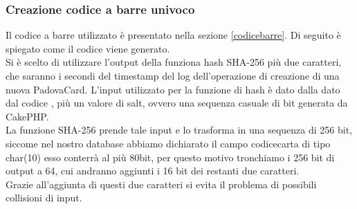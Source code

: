 \subsubsection{Creazione codice a barre univoco}
Il codice a barre utilizzato è presentato nella sezione \ref{codicebarre}. Di seguito è spiegato come il codice viene generato. \\

Si è scelto di utilizzare l'output della funziona hash SHA-256 più due caratteri, che saranno i secondi del timestamp del log dell'operazione di creazione di una nuova PadovaCard. 
L'input utilizzato per la funzione di hash è dato dalla dato dal codice \tlite, più un valore di salt, ovvero una sequenza casuale di bit generata da CakePHP.\\

La funzione SHA-256 prende tale input e lo trasforma in una sequenza di 256 bit, siccome nel nostro database abbiamo dichiarato il campo codicecarta di tipo char(10) esso conterrà al più 80bit, per questo motivo tronchiamo i 256 bit di output a 64, cui andranno aggiunti i 16 bit dei restanti due caratteri.\\ 

Grazie all'aggiunta di questi due caratteri si evita il problema di possibili collisioni di input.



